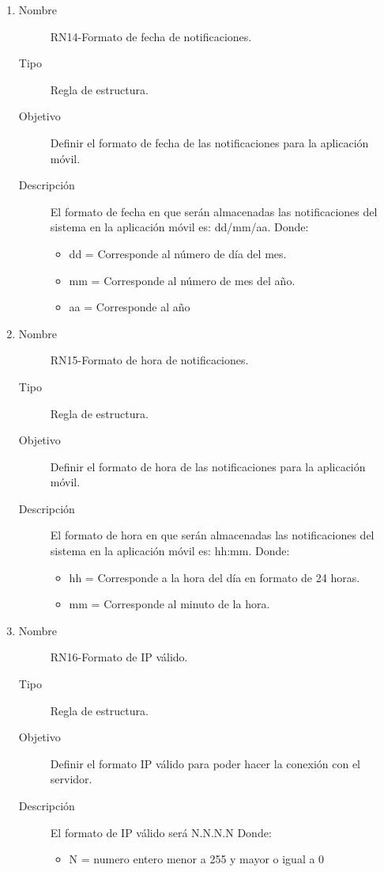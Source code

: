 \begin{enumerate}[label=RN\arabic*.]
\item \label{RN14}
		\begin{description}
			\item[Nombre] RN14-Formato de fecha de notificaciones.
			\item[Tipo] Regla de estructura.
			\item[Objetivo] Definir el formato de fecha de las notificaciones para la aplicación móvil.
			\item[Descripción] El formato de fecha en que serán almacenadas las notificaciones del sistema en la aplicación móvil es: dd/mm/aa.
			Donde:
			\begin{itemize}
		 		\item dd = Corresponde al número de día del mes.
		 		\item mm = Corresponde al número de mes del año.
		 		\item aa = Corresponde al año
		    \end{itemize}
		\end{description}
		
\item \label{RN15}
		\begin{description}
			\item[Nombre] RN15-Formato de hora de notificaciones.
			\item[Tipo] Regla de estructura.
			\item[Objetivo] Definir el formato de hora de las notificaciones para la aplicación móvil.
			\item[Descripción] El formato de hora en que serán almacenadas las notificaciones del sistema en la aplicación móvil es: hh:mm.
			Donde:
			\begin{itemize}
		 		\item hh = Corresponde a la hora del día en formato de 24 horas.
		 		\item mm = Corresponde al minuto de la hora.
		    \end{itemize}
		\end{description}

\item \label{RN16}
		\begin{description}
			\item[Nombre] RN16-Formato de IP válido.
			\item[Tipo] Regla de estructura.
			\item[Objetivo] Definir el formato IP válido para poder hacer la conexión con el servidor.
			\item[Descripción] El formato de IP válido será N.N.N.N
			Donde:
			\begin{itemize}
		 		\item N = numero entero menor a 255 y mayor o igual a 0
		    \end{itemize}
		\end{description}

\end{enumerate}